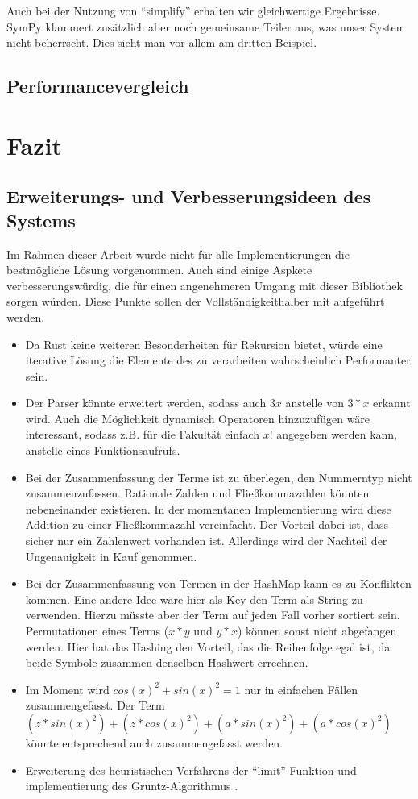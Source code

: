 \documentclass[11pt,a4paper, ngerman]{article}
\begin{document}
Auch bei der Nutzung von ``simplify'' erhalten wir gleichwertige Ergebnisse. SymPy klammert zusätzlich aber noch gemeinsame Teiler aus, was unser System nicht beherrscht. Dies sieht man vor allem am dritten Beispiel.

\subsection{Performancevergleich}

\newpage

\section{Fazit}
\subsection{Erweiterungs- und Verbesserungsideen des Systems}
Im Rahmen dieser Arbeit wurde nicht für alle Implementierungen die bestmögliche Lösung vorgenommen. Auch sind einige Aspkete verbesserungswürdig, die für einen angenehmeren Umgang mit dieser Bibliothek sorgen würden. Diese Punkte sollen der Vollständigkeithalber mit aufgeführt werden.
\begin{itemize}
    \item Da Rust keine weiteren Besonderheiten für Rekursion bietet, würde eine iterative Lösung die Elemente des  zu verarbeiten wahrscheinlich Performanter sein.
    \item Der Parser könnte erweitert werden, sodass auch $3x$ anstelle von $3*x$ erkannt wird. Auch die Möglichkeit dynamisch Operatoren hinzuzufügen wäre interessant, sodass z.B. für die Fakultät einfach $x!$ angegeben werden kann, anstelle eines Funktionsaufrufs.
    \item Bei der Zusammenfassung der Terme ist zu überlegen, den Nummerntyp nicht zusammenzufassen. Rationale Zahlen und Fließkommazahlen könnten nebeneinander existieren. In der momentanen Implementierung wird diese Addition zu einer Fließkommazahl vereinfacht. Der Vorteil dabei ist, dass sicher nur ein Zahlenwert vorhanden ist. Allerdings wird der Nachteil der Ungenauigkeit in Kauf genommen.
    \item Bei der Zusammenfassung von Termen in der HashMap kann es zu Konflikten kommen. Eine andere Idee wäre hier als Key den Term als String zu verwenden. Hierzu müsste aber der Term auf jeden Fall vorher sortiert sein. Permutationen eines Terms ($x*y$ und $y*x$) können sonst nicht abgefangen werden. Hier hat das Hashing den Vorteil, das die Reihenfolge egal ist, da beide Symbole zusammen denselben Hashwert errechnen.
    \item Im Moment wird $cos(x)^2+sin(x)^2 = 1$ nur in einfachen Fällen zusammengefasst. Der Term $(z*sin(x)^2)+(z*cos(x)^2) + (a*sin(x)^2)+(a*cos(x)^2)$ könnte entsprechend auch zusammengefasst werden.
    \item Erweiterung des heuristischen Verfahrens der ``limit''-Funktion und implementierung des Gruntz-Algorithmus \cite{GruntzPdf}.
\end{itemize}
\end{document}
